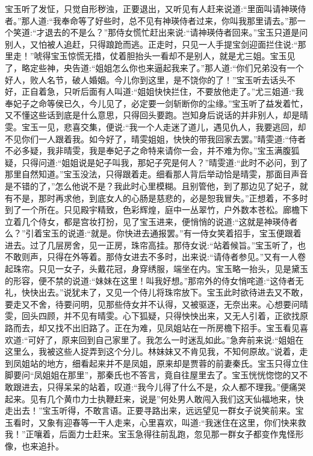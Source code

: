 \begin{parag}
    宝玉听了发怔，只觉自形秽浊，正要退出，又听见有人赶来说道:“里面叫请神瑛侍者。”那人道:“我奉命等了好些时，总不见有神瑛侍者过来，你叫我那里请去。”那一个笑道:“才退去的不是么？”那侍女慌忙赶出来说:“请神瑛侍者回来。”宝玉只道是问别人，又怕被人追赶，只得踉跄而逃。正走时，只见一人手提宝剑迎面拦住说:“那里走！”唬得宝玉惊慌无措，仗着胆抬头一看却不是别人，就是尤三姐。宝玉见了，略定些神，央告道:“姐姐怎么你也来逼起我来了。”那人道:“你们兄弟没有一个好人，败人名节，破人婚姻。今儿你到这里，是不饶你的了！”宝玉听去话头不好，正自着急，只听后面有人叫道:“姐姐快快拦住，不要放他走了。”尤三姐道:“我奉妃子之命等侯已久，今儿见了，必定要一剑斩断你的尘缘。”宝玉听了益发着忙，又不懂这些话到底是什么意思，只得回头要跑。岂知身后说话的并非别人，却是晴雯。宝玉一见，悲喜交集，便说:“我一个人走迷了道儿，遇见仇人，我要逃回，却不见你们一人跟着我。如今好了，晴雯姐姐，快快的带我回家去罢。”晴雯道:“侍者不必多疑，我非晴雯，我是奉妃子之命特来请你一会，并不难为你。”宝玉满腹狐疑，只得问道:“姐姐说是妃子叫我，那妃子究是何人？”晴雯道:“此时不必问，到了那里自然知道。”宝玉没法，只得跟着走。细看那人背后举动恰是晴雯，那面目声音是不错的了，”怎么他说不是？我此时心里模糊。且别管他，到了那边见了妃子，就有不是，那时再求他，到底女人的心肠是慈悲的，必是恕我冒失。”正想着，不多时到了一个所在。只见殿宇精致，色彩辉煌，庭中一丛翠竹，户外数本苍松。廊檐下立着几个侍女，都是宫妆打扮，见了宝玉进来，便悄悄的说道:“这就是神瑛侍者么？”引着宝玉的说道:“就是。你快进去通报罢。”有一侍女笑着招手，宝玉便跟着进去。过了几层房舍，见一正房，珠帘高挂。那侍女说:“站着候旨。”宝玉听了，也不敢则声，只得在外等着。那侍女进去不多时，出来说:“请侍者参见。”又有一人卷起珠帘。只见一女子，头戴花冠，身穿绣服，端坐在内。宝玉略一抬头，见是黛玉的形容，便不禁的说道:“妹妹在这里！叫我好想。”那帘外的侍女悄咤道:“这侍者无礼，快快出去。”说犹未了，又见一个侍儿将珠帘放下。宝玉此时欲待进去又不敢，要走又不舍，待要问明，见那些侍女并不认得，又被驱逐，无奈出来。心想要问晴雯，回头四顾，并不见有晴雯。心下狐疑，只得怏怏出来，又无人引着，正欲找原路而去，却又找不出旧路了。正在为难，见凤姐站在一所房檐下招手。宝玉看见喜欢道:“可好了，原来回到自己家里了。我怎么一时迷乱如此。”急奔前来说:“姐姐在这里么，我被这些人捉弄到这个分儿。林妹妹又不肯见我，不知何原故。”说着，走到凤姐站的地方，细看起来并不是凤姐，原来却是贾蓉的前妻秦氏。宝玉只得立住脚要问“凤姐姐在那里”，那秦氏也不答言，竟自往屋里去了。宝玉恍恍惚惚的又不敢跟进去，只得呆呆的站着，叹道:“我今儿得了什么不是，众人都不理我。”便痛哭起来。见有几个黄巾力士执鞭赶来，说是”何处男人敢闯入我们这天仙福地来，快走出去！”宝玉听得，不敢言语。正要寻路出来，远远望见一群女子说笑前来。宝玉看时，又象有迎春等一干人走来，心里喜欢，叫道:“我迷住在这里，你们快来救我！”正嚷着，后面力士赶来。宝玉急得往前乱跑，忽见那一群女子都变作鬼怪形像，也来追扑。
\end{parag}


